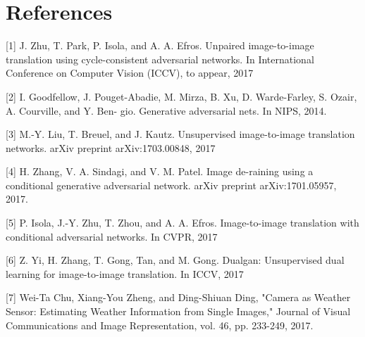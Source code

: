 \documentclass{article}
\begin{document}
\section*{References}

\small
\label{[1]}[1] J. Zhu, T. Park, P. Isola, and A. A. Efros. Unpaired image-to-image 
translation using cycle-consistent adversarial networks. 
In International Conference on Computer Vision (ICCV), to appear, 2017

\label{[2]}[2] I. Goodfellow, J. Pouget-Abadie, M. Mirza, B. Xu, D. Warde-Farley, 
S. Ozair, A. Courville, and Y. Ben- gio. Generative adversarial nets. 
In NIPS, 2014.

\label{[3]}[3] M.-Y. Liu, T. Breuel, and J. Kautz. Unsupervised 
image-to-image translation networks. arXiv preprint arXiv:1703.00848, 2017

\label{[4]}[4] H. Zhang, V. A. Sindagi, and V. M. Patel. Image de-raining using a conditional generative 
adversarial network. arXiv preprint arXiv:1701.05957, 2017.

\label{[5]}[5] P. Isola, J.-Y. Zhu, T. Zhou, and A. A. Efros. 
Image-to-image translation with conditional adversarial networks. 
In CVPR, 2017

\label{[6]}[6] Z. Yi, H. Zhang, T. Gong, Tan, and M. Gong. Dualgan: 
Unsupervised dual learning for image-to-image translation. 
In ICCV, 2017

\label{[7]}[7] Wei-Ta Chu, Xiang-You Zheng, and Ding-Shiuan Ding, "Camera as Weather Sensor: Estimating Weather Information from Single Images," Journal of Visual Communications and Image Representation, vol. 46, pp. 233-249, 2017.
\end{document}
